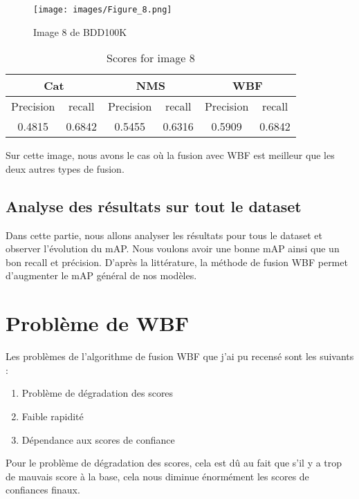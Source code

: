 \documentclass{article}
\begin{document}
\begin{figure}[htp]
    \centering
    \texttt{[image: images/Figure\_8.png]}
    \caption{Image 8 de BDD100K}
    \label{fig:galaxy}
\end{figure}

\begin{table}[h!]
    \centering
    \begin{tabular}{|c|c|c|c|c|c|}
        \hline
        \multicolumn{2}{|c|}{Cat} &\multicolumn{2}{|c|}{NMS} & \multicolumn{2}{|c|}{WBF} \\
        \hline 
         Precision & recall & Precision & recall & Precision & recall \\
         \hline 
         0.4815 & 0.6842 & 0.5455 & 0.6316 & 0.5909 & 0.6842 \\ 
    \hline
    \end{tabular}
    \caption{Scores for image 8}
    \label{tab:my_label}
\end{table}

Sur cette image, nous avons le cas où la fusion avec WBF est meilleur que les deux autres types de fusion.

\subsection{Analyse des résultats sur tout le dataset}

Dans cette partie, nous allons analyser les résultats pour tous le dataset et observer l'évolution du mAP. Nous voulons avoir une bonne mAP ainsi que un bon recall et précision. D'après la littérature, la méthode de fusion WBF permet d'augmenter le mAP général de nos modèles. 
\section{Problème de WBF}

Les problèmes de l'algorithme de fusion WBF que j'ai pu recensé sont les suivants :
\begin{enumerate}
    \item Problème de dégradation des scores
    \item Faible rapidité 
    \item Dépendance aux scores de confiance
\end{enumerate}

Pour le problème de dégradation des scores, cela est dû au fait que s'il y a trop de mauvais score à la base, cela nous diminue énormément les scores de confiances finaux.
\end{document}
